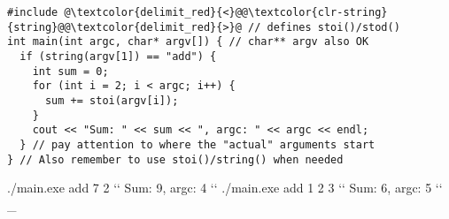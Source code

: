 \documentclass[7pt, twocolumn]{extarticle}
\begin{document}
\begin{small}
\begin{minipage}[h]{6.3cm}
  \begin{tcolorbox}[top=-5pt,bottom=-5pt,left=-1pt,right=-1pt,center title,toptitle=-0.6mm,
  bottomtitle=-0.6mm,boxrule=0.5pt,arc=0pt]
              {
              \begin{lstlisting}[style = mystyle]
#include @\textcolor{delimit_red}{<}@@\textcolor{clr-string}{string}@@\textcolor{delimit_red}{>}@ // defines stoi()/stod()
int main(int argc, char* argv[]) { // char** argv also OK
  if (string(argv[1]) == "add") {
    int sum = 0;
    for (int i = 2; i < argc; i++) {
      sum += stoi(argv[i]);
    }
    cout << "Sum: " << sum << ", argc: " << argc << endl;
  } // pay attention to where the "actual" arguments start
} // Also remember to use stoi()/string() when needed

\end{lstlisting}
}
   \end{tcolorbox}
    \end{minipage}
    \hspace{0pt}
\begin{minipage}[h]{3.9cm} 
\begin{ubuntu}
./main.exe add 7 2 `\StartConsole`
Sum: 9, argc: 4 ``
./main.exe add 1 2 3 `\StartConsole`
Sum: 6, argc: 5 ``
_
\end{ubuntu}
\end{minipage}



\end{small}
\end{document}
